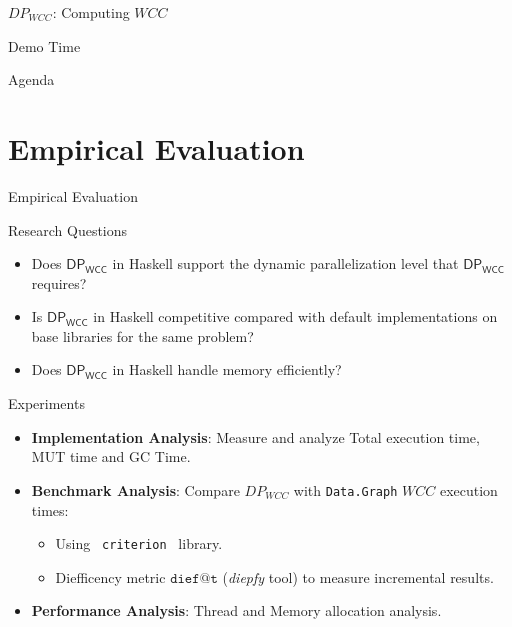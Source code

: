 \documentclass{beamer}
\newcommand{\dpwcc}{\mathsf{DP_{WCC}}}
\begin{document}
  \begin{frame}[fragile]{$DP_{WCC}$: Computing $WCC$}
    \begin{block}{Demo Time}
    \end{block}
  \end{frame}

  \begin{frame}{Agenda}
    \section{Empirical Evaluation}
    \tableofcontents[currentsection]
  \end{frame}


  \begin{frame}[fragile]{Empirical Evaluation}
    \begin{block}{Research Questions}
      \begin{itemize}
            \item Does $\dpwcc$ in Haskell support the dynamic parallelization level that $\dpwcc$ requires?
            \item Is $\dpwcc$ in Haskell competitive compared with default implementations on base libraries for the same problem?
            \item Does $\dpwcc$ in Haskell handle memory efficiently?
        \end{itemize}        
    \end{block}
    \begin{block}{Experiments}
      \begin{itemize}
        \item \textbf{Implementation Analysis}: Measure and analyze Total execution time, MUT time and GC Time.
        \item \textbf{Benchmark Analysis}: Compare $DP_{WCC}$ with \texttt{Data.Graph} $WCC$ execution times:
        \begin{itemize}
          \item Using \texttt{ criterion } library.
          \item Diefficency metric $\mathtt{dief@t}$ (\textit{diepfy} tool) to measure incremental results.
        \end{itemize}
        \item \textbf{Performance Analysis}: Thread and Memory allocation analysis.
      \end{itemize}
    \end{block}
  \end{frame}
\end{document}
